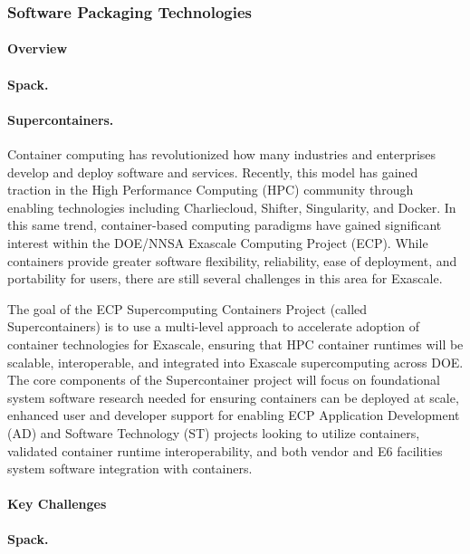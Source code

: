 \subsubsection{ Software Packaging Technologies} \label{subsubsect:sw-packaging}

\paragraph{Overview} 

\paragraph{Spack.}

\paragraph{Supercontainers.}
Container computing has revolutionized how many industries and enterprises develop and deploy software and services. Recently, this model has gained traction in the High Performance Computing (HPC) community through enabling technologies including Charliecloud, Shifter, Singularity, and Docker.  In this same trend, container-based computing paradigms have gained significant interest within the DOE/NNSA Exascale Computing Project (ECP). While containers provide greater software flexibility, reliability, ease of deployment, and portability for users, there are still several challenges in this area for Exascale.

The goal of the ECP Supercomputing Containers Project (called Supercontainers) is to use a multi-level approach to accelerate adoption of container technologies for Exascale, ensuring that HPC container runtimes will be scalable, interoperable, and integrated into Exascale supercomputing across DOE. The core components of the Supercontainer project will focus on foundational system software research needed for ensuring containers can be deployed at scale, enhanced user and developer support for enabling ECP Application Development (AD) and Software Technology (ST) projects looking to utilize containers, validated container runtime interoperability, and both vendor and E6 facilities system software integration with containers.


\paragraph{Key  Challenges}


\paragraph{Spack.}


